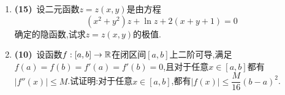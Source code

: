 \documentclass{ctexart}
\begin{document}
\begin{enumerate}[leftmargin=*,label=\textbf{\arabic*.}]
\begin{enumerate}[label=\tbf{(\arabic*)}]
\[\begin{array}{l}
                    \dfrac{2xy^3}{x^2+y^4},(x,y)\neq(0,0)\\
                    0,(x,y)=(0,0)
                \end{array}\right.\]计算方向导数$\left.\dfrac{\p f}{\p\mbf{l}}\right|_{(0,0)}$.其中单位向量$\mbf{l}=(\cos\alpha,\sin\alpha)$,$\alpha\in[0,2\pi)$.
            \item \textbf{(3)}\ 若二元函数$g(x,y)$在$(x_0,y_0)$处取到极小值,那么对于某一$\alpha\in[0,2\pi)$,$t=0$是否一定是$h(t)=g(x_0+t\cos\alpha,y_0+t\sin\alpha)$的极小值点?说明理由.
            \item \textbf{(2)}\ 若对于任意$\alpha\in[0,2\pi)$,$t=0$是是$h(t)=g(x_0+t\cos\alpha,y_0+t\sin\alpha)$的极小值点,那么$(x_0,y_0)$是否一定是$g(x,y)$的极小值点?说明理由.
        \end{enumerate}
    \item \textbf{(15)}\ 设二元函数$z=z(x,y)$是由方程
        \[(x^2+y^2)z+\ln z+2(x+y+1)=0\]确定的隐函数,试求$z=z(x,y)$的极值.
    \item \textbf{(10)}\ 设函数$f:[a,b]\to\mathbb{R}$在闭区间$[a,b]$上二阶可导,满足$f(a)=f(b)=f'(a)=f'(b)=0$,且对于任意$x\in[a,b]$都有$|f''(x)|\leqslant M$.试证明:对于任意$x\in[a,b]$,都有$|f(x)|\leqslant\dfrac{M}{16}(b-a)^2$.
\end{enumerate}
\end{document}
